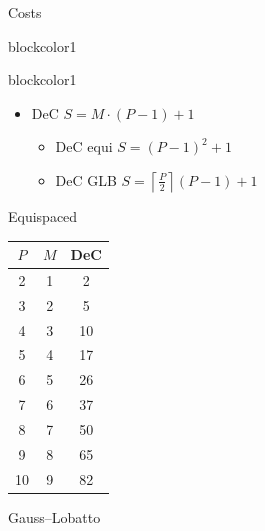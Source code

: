 \documentclass[9pt,compress,t,aspectratio=169]{beamer}
\begin{document}
	\begin{frame}{Costs}
		\begin{beamercolorbox}[sep=1em,wd=\textwidth]{blockcolor1}
			\centering
			\Large {}
		\end{beamercolorbox}
	\vspace{5mm}\pause
	
	\begin{minipage}{0.4\textwidth}
		\begin{beamercolorbox}[sep=1em,wd=\textwidth]{blockcolor1}
		\begin{itemize}
			\item DeC $S= M\cdot (P-1)+1$
			\begin{itemize}
				\item DeC equi $S=(P-1)^2+1$
				\item DeC GLB $S=\left\lceil \frac{P}{2} \right\rceil(P-1)+1$
			\end{itemize}
		\end{itemize}
	\end{beamercolorbox}
	\end{minipage}
	\begin{minipage}{0.28\textwidth}
		\centering Equispaced
		
		\begin{tabular}{|c|c||c|}\hline
			$P$ &$M$ & DeC\\ \hline
			2&1&2\\
			3&2&5\\
			4&3&10\\
			{\color{red}5}&4&{\color{red}17}\\
			6&5&26\\
			7&6&37\\
			8&7&50\\
			9&8&65\\
			10&9&82\\ \hline
		\end{tabular}
	\end{minipage}
	\begin{minipage}{0.28\textwidth}
		\centering Gauss--Lobatto
		

\end{minipage}
\end{frame}
\end{document}
